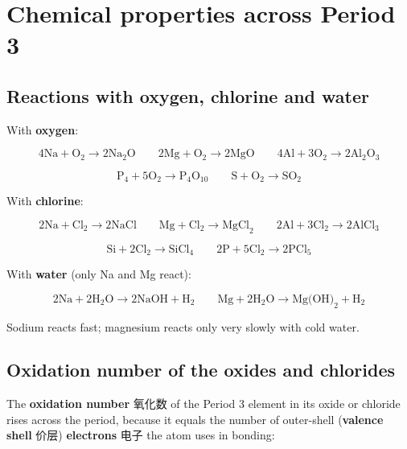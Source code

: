 \documentclass[11pt]{article}
\begin{document}
\section*{Chemical properties across Period 3}

\subsection*{Reactions with oxygen, chlorine and water}

With \textbf{oxygen}:

\[
4\text{Na} + \text{O}_2 \rightarrow 2\text{Na}_2\text{O} \qquad 2\text{Mg} + \text{O}_2 \rightarrow 2\text{MgO} \qquad 4\text{Al} + 3\text{O}_2 \rightarrow 2\text{Al}_2\text{O}_3
\]

\[
\text{P}_4 + 5\text{O}_2 \rightarrow \text{P}_4\text{O}_{10} \qquad \text{S} + \text{O}_2 \rightarrow \text{SO}_2
\]

With \textbf{chlorine}:

\[
2\text{Na} + \text{Cl}_2 \rightarrow 2\text{NaCl} \qquad \text{Mg} + \text{Cl}_2 \rightarrow \text{MgCl}_2 \qquad 2\text{Al} + 3\text{Cl}_2 \rightarrow 2\text{AlCl}_3
\]

\[
\text{Si} + 2\text{Cl}_2 \rightarrow \text{SiCl}_4 \qquad 2\text{P} + 5\text{Cl}_2 \rightarrow 2\text{PCl}_5
\]

With \textbf{water} (only Na and Mg react):

\[
2\text{Na} + 2\text{H}_2\text{O} \rightarrow 2\text{NaOH} + \text{H}_2 \qquad \text{Mg} + 2\text{H}_2\text{O} \rightarrow \text{Mg(OH)}_2 + \text{H}_2
\]

Sodium reacts fast; magnesium reacts only very slowly with cold water.

\subsection*{Oxidation number of the oxides and chlorides}

The \textbf{oxidation number} 氧化数 of the Period 3 element in its oxide or chloride rises across the period, because it equals the number of outer-shell (\textbf{valence shell} 价层) \textbf{electrons} 电子 the atom uses in bonding:

\begin{center}
\end{center}
\end{document}

